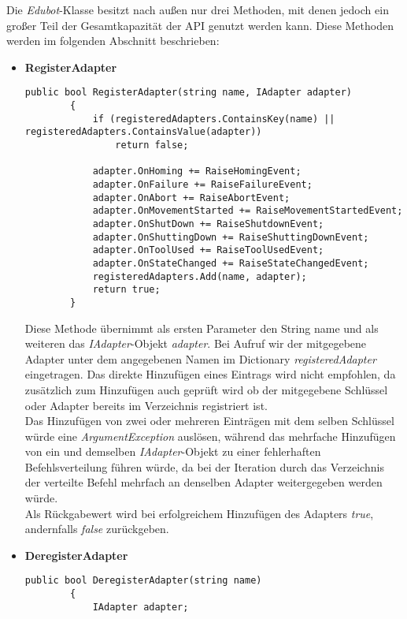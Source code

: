 Die \textit{Edubot}-Klasse besitzt nach außen nur drei Methoden, mit denen jedoch ein großer Teil der Gesamtkapazität der API genutzt werden kann. Diese Methoden werden im folgenden Abschnitt beschrieben:
\begin{itemize}
\item \textbf{RegisterAdapter}
\begin{lstlisting}[language = CSharp, captionpos=b, caption={Die RegisterAdapter-Methode}]
public bool RegisterAdapter(string name, IAdapter adapter)
        {
            if (registeredAdapters.ContainsKey(name) || registeredAdapters.ContainsValue(adapter))
                return false;

            adapter.OnHoming += RaiseHomingEvent;
            adapter.OnFailure += RaiseFailureEvent;
            adapter.OnAbort += RaiseAbortEvent;
            adapter.OnMovementStarted += RaiseMovementStartedEvent;
            adapter.OnShutDown += RaiseShutdownEvent;
            adapter.OnShuttingDown += RaiseShuttingDownEvent;
            adapter.OnToolUsed += RaiseToolUsedEvent;
            adapter.OnStateChanged += RaiseStateChangedEvent;
            registeredAdapters.Add(name, adapter);
            return true;
        }
\end{lstlisting}
Diese Methode übernimmt als ersten Parameter den String name und als weiteren das \textit{IAdapter}-Objekt \textit{adapter}. Bei Aufruf wir der mitgegebene Adapter unter dem angegebenen Namen im Dictionary \textit{registeredAdapter} eingetragen. Das direkte Hinzufügen eines Eintrags wird nicht empfohlen, da zusätzlich zum Hinzufügen auch geprüft wird ob der mitgegebene Schlüssel oder Adapter bereits im Verzeichnis registriert ist.\\
Das Hinzufügen von zwei oder mehreren Einträgen mit dem selben Schlüssel würde eine \textit{ArgumentException} auslösen, während das mehrfache Hinzufügen von ein und demselben \textit{IAdapter}-Objekt zu einer fehlerhaften Befehlsverteilung führen würde, da bei der Iteration durch das Verzeichnis der verteilte Befehl mehrfach an denselben Adapter weitergegeben werden würde. \\
Als Rückgabewert wird bei erfolgreichem Hinzufügen des Adapters \textit{true}, andernfalls \textit{false} zurückgeben.
\item \textbf{DeregisterAdapter}
\begin{lstlisting}[language = CSharp, captionpos=b, caption={Die DeregisterAdapter-Methode}]
public bool DeregisterAdapter(string name)
        {
            IAdapter adapter;

\end{lstlisting}
\end{itemize}
